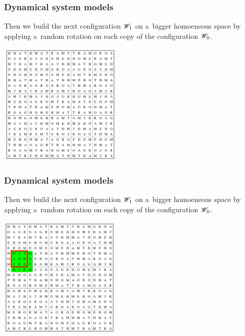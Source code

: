 \begin{frame}
  \frametitle{Dynamical system models}
  
  {\footnotesize 
  Then we build the next configuration $\mathscr{W}_1$ on a~bigger homoeneous space 
  by applying a~random rotation on each copy of the configuration $\mathscr{W}_0$. }
  
  \begin{center}
   \includegraphics[height=58mm]{pic2.jpg}
  \end{center}
  
\end{frame}


\begin{frame}
  \frametitle{Dynamical system models}
  
  {\footnotesize 
  Then we build the next configuration $\mathscr{W}_1$ on a~bigger homoeneous space 
  by applying a~random rotation on each copy of the configuration $\mathscr{W}_0$. }
  
  \begin{center}
   \includegraphics[height=57mm]{pic3.jpg}
  \end{center}
  
\end{frame}


